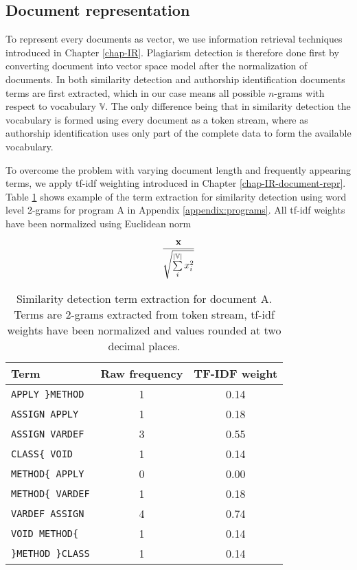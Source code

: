 \subsection{Document representation}

To represent every documents as vector, we use information retrieval techniques introduced in Chapter \ref{chap-IR}. Plagiarism detection is therefore done first by converting document into vector space model after the normalization of documents. In both similarity detection and authorship identification documents terms are first extracted, which in our case means all possible $n$-grams with respect to vocabulary $\mathbb{V}$. The only difference being that in similarity detection the vocabulary is formed using every document as a token stream, where as authorship identification uses only part of the complete data to form the available vocabulary. 

To overcome the problem with varying document length and frequently appearing terms, we apply tf-idf weighting introduced in Chapter \ref{chap-IR-document-repr}. Table \ref{tbl-ngram-sd} shows example of the term extraction for similarity detection using word level 2-grams for program A in Appendix \ref{appendix:programs}. All tf-idf weights have been normalized using Euclidean norm 

\begin{equation}
    \dfrac{\mathbf{x}}
          {\sqrt{\sum \limits_i^{|\mathbb{V}|} x_i^2}}
\end{equation}


\begin{table}[ht]
\centering
\caption{Similarity detection term extraction for document A. Terms are 2-grams extracted from token stream, tf-idf weights have been normalized and values rounded at two decimal places.}
\label{tbl-ngram-sd}
\begin{tabular}{l|c|c}
\bf Term & \bf Raw frequency & \bf TF-IDF weight \\ \hline
    \texttt{APPLY \}METHOD} & 1 & 0.14\\
    \texttt{ASSIGN APPLY} & 1 & 0.18\\
    \texttt{ASSIGN VARDEF} & 3 & 0.55\\
    \texttt{CLASS\{ VOID} & 1 & 0.14\\
    \texttt{METHOD\{ APPLY} & 0 & 0.00\\
    \texttt{METHOD\{ VARDEF} & 1 & 0.18\\
    \texttt{VARDEF ASSIGN} & 4 & 0.74\\
    \texttt{VOID METHOD\{} & 1 & 0.14\\
    \texttt{\}METHOD \}CLASS} & 1 & 0.14\\
\end{tabular}
\end{table}

